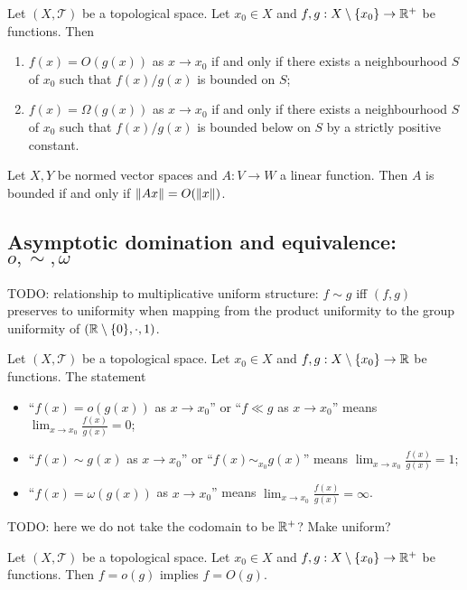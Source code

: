 \begin{lemma}
Let $(X,\mathcal{T})$ be a topological space. Let $x_0 \in X$ and $f,g: X\setminus\{x_0\}\to \mathbb{R}^+$ be functions. Then
\begin{enumerate}
\item $f(x) = O(g(x))$ as $x\to x_0$ \textup{if and only if} there exists a neighbourhood $S$ of $x_0$ such that $f(x)/g(x)$ is bounded on $S$;
\item $f(x) = \Omega(g(x))$ as $x\to x_0$ \textup{if and only if} there exists a neighbourhood $S$ of $x_0$ such that $f(x)/g(x)$ is bounded below on $S$ by a strictly positive constant.
\end{enumerate}
\end{lemma}

\begin{lemma} \label{asymptoticsBoundedFunctionNormedSpaces}
Let $X,Y$ be normed vector spaces and $A: V\to W$ a linear function. Then $A$ is bounded \textup{if and only if} $\lVert Ax\rVert = O(\lVert x\rVert)$.
\end{lemma}

\subsection{Asymptotic domination and equivalence: $o,\sim,\omega$}

TODO: relationship to multiplicative uniform structure: $f \sim g$ iff $(f,g)$ preserves to uniformity when mapping from the product uniformity to the group uniformity of $\sSet{\R\setminus\{0\}, \cdot, 1}$.

\begin{definition}
Let $(X,\mathcal{T})$ be a topological space. Let $x_0 \in X$ and $f,g: X\setminus\{x_0\}\to \mathbb{R}$ be functions. The statement
\begin{itemize}
\item ``$f(x) = o(g(x))$ as $x\to x_0$'' or ``$f \ll g$ as $x\to x_0$'' means $\lim_{x\to x_0} \frac{f(x)}{g(x)} = 0$;
\item ``$f(x) \sim g(x)$ as $x\to x_0$'' or ``$f(x) \sim_{x_0} g(x)$'' means $\lim_{x\to x_0} \frac{f(x)}{g(x)} = 1$;
\item ``$f(x) = \omega(g(x))$ as $x\to x_0$'' means $\lim_{x\to x_0} \frac{f(x)}{g(x)} = \infty$.
\end{itemize}
\end{definition}
TODO: here we do not take the codomain to be $\mathbb{R}^+$? Make uniform?

\begin{lemma}
Let $(X,\mathcal{T})$ be a topological space. Let $x_0 \in X$ and $f,g: X\setminus\{x_0\}\to \mathbb{R}^+$ be functions. Then $f = o(g)$ implies $f = O(g)$.
\end{lemma}

